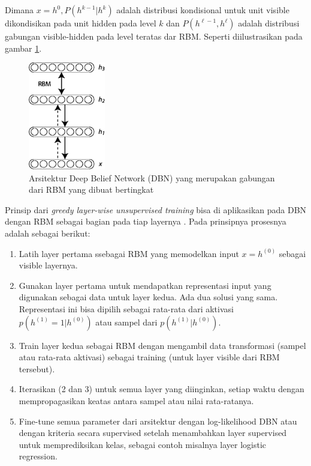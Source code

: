 Dimana $x=h^0, P(h^{k-1} | h^k)$ adalah distribusi kondisional untuk unit visible dikondisikan pada unit hidden pada level $k$ dan  $P(h^{\ell-1}, h^{\ell})$ adalah distribusi gabungan visible-hidden pada level teratas dar RBM. Seperti diilustrasikan pada gambar \ref{fig:dbn3}.

\begin{figure}
	\centering
	\includegraphics[width=0.3\textwidth]
		{pics/DBN3.png}
	\caption{Arsitektur Deep Belief Network (DBN) yang merupakan gabungan dari RBM yang dibuat bertingkat}
	\label{fig:dbn3}
\end{figure}


Prinsip dari \textit{greedy layer-wise unsupervised training} bisa di aplikasikan pada DBN dengan RBM sebagai bagian pada tiap layernya \citep{bengio2007greedy}. Pada prinsipnya prosesnya adalah sebagai berikut:
\begin{enumerate}
\item Latih layer pertama ssebagai RBM yang memodelkan input $x = h^{(0)}$ sebagai visible layernya.
\item Gunakan layer pertama untuk mendapatkan representasi input yang digunakan sebagai data untuk layer kedua. Ada dua solusi yang sama. Representasi ini bisa dipilih sebagai rata-rata dari aktivasi $p(h^{(1)}=1|h^{(0)})$ atau sampel dari $p(h^{(1)}|h^{(0)})$.
\item Train layer kedua sebagai RBM dengan mengambil data transformasi (sampel atau rata-rata aktivasi) sebagai training (untuk layer visible dari RBM tersebut).
\item Iterasikan (2 dan 3) untuk semua layer yang diinginkan, setiap waktu dengan mempropagasikan keatas antara sampel atau nilai rata-ratanya.
\item Fine-tune semua parameter dari arsitektur dengan log-likelihood DBN atau dengan kriteria secara supervised setelah menambahkan layer supervised untuk memprediksikan kelas, sebagai contoh misalnya layer logistic regression.
\end{enumerate}

